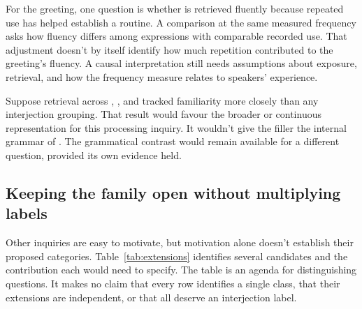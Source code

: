 \documentclass[12pt]{article}
\begin{document}
For the greeting, one question is whether  is
retrieved fluently because repeated use has helped establish a routine.
A comparison at the same measured frequency asks how fluency differs
among expressions with comparable recorded use. That adjustment doesn't
by itself identify how much repetition contributed to the greeting's
fluency. A causal interpretation still needs assumptions about exposure,
retrieval, and how the frequency measure relates to speakers' experience.

Suppose retrieval across , , and
 tracked familiarity more closely than any
interjection grouping. That result would favour the broader or continuous
representation for this processing inquiry. It wouldn't give the filler
 the internal grammar of . The
grammatical contrast would remain available for a different question,
provided its own evidence held.

\subsection{Keeping the family open without multiplying labels}

Other inquiries are easy to motivate, but motivation alone doesn't
establish their proposed categories. Table~\ref{tab:extensions} identifies
several candidates and the contribution each would need to specify.
The table is an agenda for distinguishing questions. It makes no
claim that every row identifies a single class, that their extensions
are independent, or that all deserve an interjection label.
\end{document}
